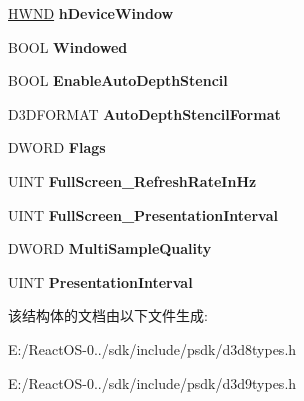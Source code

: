 \begin{DoxyCompactItemize}
\item 
\mbox{\label{struct___d3_d_p_r_e_s_e_n_t___p_a_r_a_m_e_t_e_r_s___a7054c1e1184790c76d1ea7cd80263cdb}} 
\hyperlink{interfacevoid}{H\+W\+ND} {\bfseries h\+Device\+Window}
\item 
\mbox{\label{struct___d3_d_p_r_e_s_e_n_t___p_a_r_a_m_e_t_e_r_s___af01e43d716d425b7e31212003836bd54}} 
B\+O\+OL {\bfseries Windowed}
\item 
\mbox{\label{struct___d3_d_p_r_e_s_e_n_t___p_a_r_a_m_e_t_e_r_s___a105dc9f6b80a42d8a1a4890b40f3908d}} 
B\+O\+OL {\bfseries Enable\+Auto\+Depth\+Stencil}
\item 
\mbox{\label{struct___d3_d_p_r_e_s_e_n_t___p_a_r_a_m_e_t_e_r_s___ae7ee7375c6ba18247a87bc9f34963adc}} 
D3\+D\+F\+O\+R\+M\+AT {\bfseries Auto\+Depth\+Stencil\+Format}
\item 
\mbox{\label{struct___d3_d_p_r_e_s_e_n_t___p_a_r_a_m_e_t_e_r_s___a603931bc43be41d7f98afe2753293903}} 
D\+W\+O\+RD {\bfseries Flags}
\item 
\mbox{\label{struct___d3_d_p_r_e_s_e_n_t___p_a_r_a_m_e_t_e_r_s___a0a46910ca71ae83baa851c6a4affd268}} 
U\+I\+NT {\bfseries Full\+Screen\+\_\+\+Refresh\+Rate\+In\+Hz}
\item 
\mbox{\label{struct___d3_d_p_r_e_s_e_n_t___p_a_r_a_m_e_t_e_r_s___adf64c9a1e48ecb7d12e39bf8fd6d7aa9}} 
U\+I\+NT {\bfseries Full\+Screen\+\_\+\+Presentation\+Interval}
\item 
\mbox{\label{struct___d3_d_p_r_e_s_e_n_t___p_a_r_a_m_e_t_e_r_s___aad315999a2e2dd0d9fd8184c9c6ff0bf}} 
D\+W\+O\+RD {\bfseries Multi\+Sample\+Quality}
\item 
\mbox{\label{struct___d3_d_p_r_e_s_e_n_t___p_a_r_a_m_e_t_e_r_s___aa5ac7bef66303fbfc676318e4f498a07}} 
U\+I\+NT {\bfseries Presentation\+Interval}
\end{DoxyCompactItemize}


该结构体的文档由以下文件生成\+:\begin{DoxyCompactItemize}
\item 
E\+:/\+React\+O\+S-\/0../sdk/include/psdk/d3d8types.\+h\item 
E\+:/\+React\+O\+S-\/0../sdk/include/psdk/d3d9types.\+h\end{DoxyCompactItemize}
